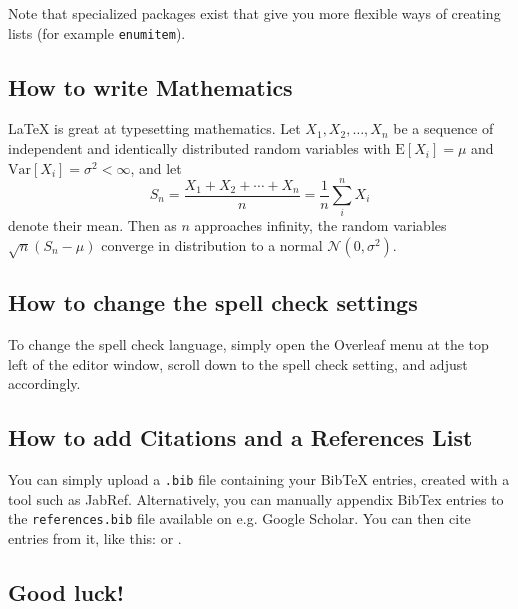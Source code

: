 \documentclass[12pt,a4paper,faculty=ea,language=en,doctype=article]{ugent-doc}
\begin{document}
Note that specialized packages exist that give you more flexible ways of creating lists (for example \verb|enumitem|). 


\subsection{How to write Mathematics}

\LaTeX{} is great at typesetting mathematics.
Let $X_1, X_2, \ldots, X_n$ be a sequence of independent and identically distributed random variables with $\text{E}[X_i] = \mu$ and $\text{Var}[X_i] = \sigma^2 < \infty$, and let
\[S_n = \frac{X_1 + X_2 + \cdots + X_n}{n}
      = \frac{1}{n}\sum_{i}^{n} X_i\]
denote their mean.
Then as $n$ approaches infinity, the random variables $\sqrt{n}(S_n - \mu)$ converge in distribution to a normal $\mathcal{N}(0, \sigma^2)$.


\subsection{How to change the spell check settings}

To change the spell check language, simply open the Overleaf menu at the top left of the editor window, scroll down to the spell check setting, and adjust accordingly.


\subsection{How to add Citations and a References List}

You can simply upload a \texttt{.bib} file containing your BibTeX entries, created with a tool such as JabRef.
Alternatively, you can manually appendix BibTex entries to the \texttt{references.bib} file available on e.g. Google Scholar. You can then cite entries from it, like this: \textcite{greenwade93} or \parencite{greenwade93}.


\subsection{Good luck!}
\end{document}

